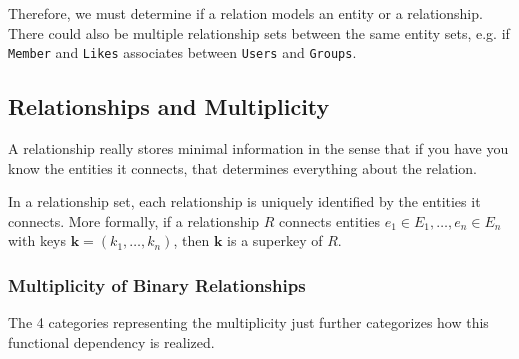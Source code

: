 \documentclass{article}
\begin{document}
      Therefore, we must determine if a relation models an entity or a relationship. There could also be multiple relationship sets between the same entity sets, e.g. if \texttt{Member} and \texttt{Likes} associates between \texttt{Users} and \texttt{Groups}. 

  \subsection{Relationships and Multiplicity} 
  
      A relationship really stores minimal information in the sense that if you have you know the entities it connects, that determines everything about the relation. 

      \begin{theorem}
        In a relationship set, each relationship is uniquely identified by the entities it connects. More formally, if a relationship $R$ connects entities $e_1 \in E_1, \ldots, e_n \in E_n$ with keys $\mathbf{k} = (k_1, \ldots, k_n)$, then $\mathbf{k}$ is a superkey of $R$. 
      \end{theorem}

    \subsubsection{Multiplicity of Binary Relationships}

      The 4 categories representing the multiplicity just further categorizes how this functional dependency is realized. 
\end{document}
